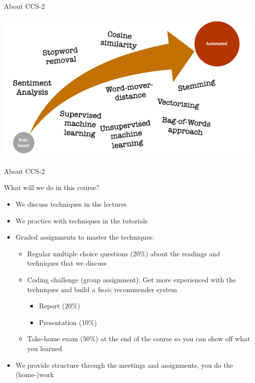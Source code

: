 \documentclass[handout]{beamer}
\begin{document}
\begin{frame}{About CCS-2}
	\begin{center}
		\includegraphics[width=\linewidth,height=\textheight,keepaspectratio]{../pictures/Roadmap_terms.png} 
	\end{center}
	
\end{frame}


\begin{frame}{About CCS-2} 

What will we do in this course?	
	\begin{itemize}
		\item We discuss techniques in the lectures
		\item We practice with techniques in the tutorials
		\item Graded assignments to master the techniques:
		\begin{itemize}
			\item Regular multiple choice questions (\(20\%\)) about the readings and techniques that we discuss
			\item Coding challenge (group assignment): Get more experienced with the techniques and build a \emph{basic} recommender system
			\begin{itemize}
				\item Report (\(20\%\))
				\item Presentation (\(10\%\))
			\end{itemize}
			\item Take-home exam (\(50\%\)) at the end of the course so you can show off what you learned
		\end{itemize}
		\item We provide structure through the meetings and assignments, you do the (home-)work
	\end{itemize}
	
\end{frame}
\end{document}
